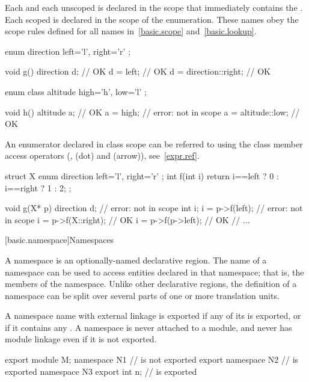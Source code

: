 \pnum
{}%
Each  and each unscoped  is
declared in the scope that immediately contains the .
Each scoped  is declared in the scope of the
enumeration.
These names obey the scope rules defined for all names
in~\ref{basic.scope} and~\ref{basic.lookup}. \begin{example}
\begin{codeblock}
enum direction { left='l', right='r' };

void g()  {
  direction d;                  // OK
  d = left;                     // OK
  d = direction::right;         // OK
}

enum class altitude { high='h', low='l' };

void h()  {
  altitude a;                   // OK
  a = high;                     // error:  not in scope
  a = altitude::low;            // OK
}
\end{codeblock}
\end{example}
%
An enumerator declared in class scope can be referred to using the class
member access operators (\tcode{::},  (dot) and \tcode{->}
(arrow)), see~\ref{expr.ref}.
\begin{example}

\begin{codeblock}
struct X {
  enum direction { left='l', right='r' };
  int f(int i) { return i==left ? 0 : i==right ? 1 : 2; }
};

void g(X* p) {
  direction d;                  // error:  not in scope
  int i;
  i = p->f(left);               // error:  not in scope
  i = p->f(X::right);           // OK
  i = p->f(p->left);            // OK
  // ...
}
\end{codeblock}
\end{example}

[basic.namespace]{Namespaces}%

\pnum
A namespace is an optionally-named declarative region. The name of a
namespace can be used to access entities declared in that namespace;
that is, the members of the namespace. Unlike other declarative regions,
the definition of a namespace can be split over several parts of one or
more translation units.

\pnum
\begin{note}
A namespace name with external linkage is exported
if any of its  is exported,
or if it contains any
.
A namespace is never attached to a module,
and never has module linkage
even if it is not exported.
\end{note}
\begin{example}
\begin{codeblock}
export module M;
namespace N1 {}                 //  is not exported
export namespace N2 {}          //  is exported
namespace N3 { export int n; }  //  is exported
\end{codeblock}
\end{example}

